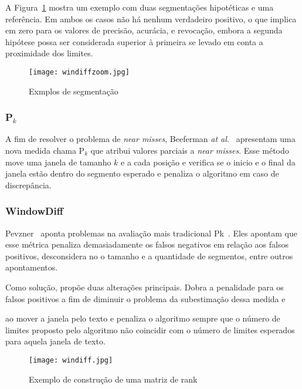 A Figura~\ref{fig:exemplosegmentacaozoom} mostra um exemplo com duas segmentações hipotéticas e uma referência. Em ambos os casos não há nenhum verdadeiro positivo, o que implica em zero para os valores de precisão, acurácia, e revocação, embora a segunda hipótese possa ser considerada superior à primeira se levado em conta a proximidade dos limites.



  \begin{figure}[!h]

	\centering
	\texttt{[image: windiffzoom.jpg]}
	\caption{Exmplos de segmentação}
	\label{fig:exemplosegmentacaozoom}

  \end{figure}



\subsubsection{P$_k$}
A fim de resolver o problema de \textit{near misses}, Beeferman \textit{at al.}~\cite{Beeferman1999} apresentam uma nova medida chama P$_k$ que atribui valores parciais a \textit{near misses}. Esse método move uma janela de tamanho $k$ e a cada posição e verifica se o inicio e o final da janela estão dentro do segmento esperado e penaliza o algoritmo em caso de discrepância.


\subsubsection{WindowDiff}

Pevzner~\cite{Pevzner200219} aponta problemas na avaliação mais tradicional Pk~\cite{Beeferman1999}. Eles apontam que esse métrica penaliza demasiadamente os falsos negativos em relação aos falsos positivos, desconsidera no o tamanho e a quantidade de segmentos, entre outros apontamentos.

Como solução, propõe duas alterações principais. Dobra a penalidade para os falsos positivos a fim de diminuir o problema da subestimação dessa medida e

ao mover a janela pelo texto e penaliza o algoritmo sempre que o número de limites proposto pelo algoritmo não coincidir com o número de limites esperados para aquela janela de texto. 




  \begin{figure}[!h]

	\centering
	\texttt{[image: windiff.jpg]}
	\caption{Exemplo de construção de uma matriz de rank}
	\label{fig:exemplosegmentacao}

  \end{figure}

